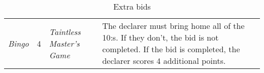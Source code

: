 \begin{table}
\begin{center}
{\begin{tabularx}{\textwidth}{ lcX | p{6cm} }
					\textit{Bingo} & 4 &
					\textit{Taintless Master's Game} &
					The declarer must bring home all of the 10:s. If they don't, the bid is not completed. If the bid is completed, the declarer scores 4 additional points.
					
			\end{tabularx}
		}
	\end{center}
	\caption{Extra bids}
	\label{tab:extraBids}
\end{table}
